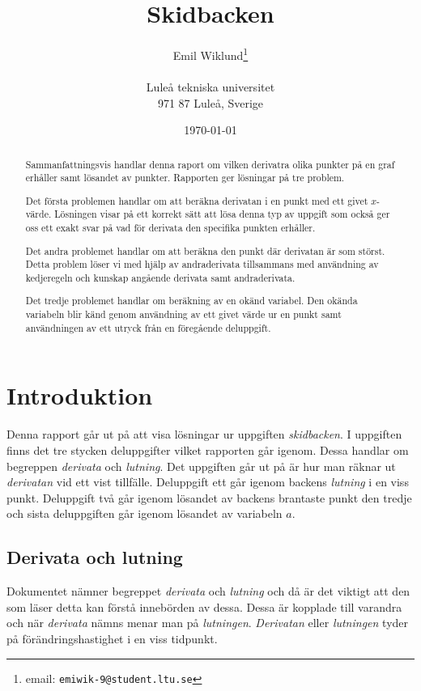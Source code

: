 \documentclass[a4paper,12pt]{article}
\title{Skidbacken}
\author{Emil Wiklund\thanks{email: \texttt{emiwik-9@student.ltu.se}}\\  
        ~ \\
        Luleå tekniska universitet \\ 
        971 87 Luleå, Sverige}
\date{\today}
\begin{document}
\linenumbers
\maketitle


\begin{abstract}
Sammanfattningsvis handlar denna raport om vilken derivatra olika
punkter på en graf erhåller samt lösandet av punkter. Rapporten ger
lösningar på tre problem. 

Det första problemen handlar om att beräkna derivatan i en punkt 
med ett givet $x$-värde. Lösningen visar på ett korrekt sätt att lösa
denna typ av uppgift som också ger oss ett exakt svar på vad för
derivata den specifika punkten erhåller.

Det andra problemet handlar om att beräkna den punkt där derivatan
är som störst. Detta problem löser vi med hjälp av andraderivata 
tillsammans med användning av kedjeregeln och kunskap angående 
derivata samt andraderivata.

Det tredje problemet handlar om beräkning av en okänd variabel.
Den okända variabeln blir känd genom användning av ett givet värde 
ur en punkt  samt användningen av ett utryck från en föregående 
deluppgift.
\end{abstract}


\section{Introduktion}
\label{sec:introduktion}


Denna rapport går ut på att visa lösningar ur uppgiften \emph{skidbacken}.
I uppgiften finns det tre stycken deluppgifter vilket rapporten går igenom.
Dessa handlar om begreppen \emph{derivata} och \emph{lutning}.
Det uppgiften går ut på är hur man räknar ut \emph{derivatan} vid ett vist 
tillfälle. Deluppgift ett går igenom backens \emph{lutning} i en viss punkt.
Deluppgift två går igenom lösandet av backens brantaste punkt den tredje 
och sista deluppgiften går igenom lösandet av variabeln $a$.
\newpage


\subsection{Derivata och lutning}


Dokumentet nämner begreppet \emph{derivata} och \emph{lutning} och då är
det viktigt att den som läser detta kan förstå innebörden av dessa. Dessa är 
kopplade till varandra och när \emph{derivata} nämns menar man på 
\emph{lutningen}. \emph{Derivatan} eller \emph{lutningen} tyder på 
förändringshastighet i en viss tidpunkt.
\end{document}

